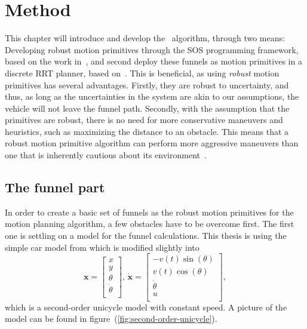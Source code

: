 \chapter{Method}

This chapter will introduce and develop the \rrtfunnel\ algorithm, through two
means: Developing robust motion primitives through the \ac{SOS} programming
framework, based on the work in~\cite{majumdarFunnelLibrariesRealtime2017}, and
second deploy these funnels as motion primitives in a discrete \ac{RRT} planner,
based on~\cite{lavalleLav98cPdf}. This is beneficial, as using \textit{robust}
motion primitives has several advantages. Firstly, they are robust to
uncertainty, and thus, as long as the uncertainties in the system are akin to
our assumptions, the vehicle will not leave the funnel path. Secondly, with the
assumption that the primitives are robust, there is no need for more
conservative maneuvers and heuristics, such as maximizing the distance to an
obstacle. This means that a robust motion primitive algorithm can perform more
aggressive maneuvers than one that is inherently cautious about its
environment~\cite{majumdarFunnelLibrariesRealtime2017}.

\section{The funnel part}

In order to create a basic set of funnels as the robust motion primitives for
the \rrtfunnel{} motion planning algorithm, a few obstacles have to be overcome
first. The first one is settling on a model for the funnel calculations. This
thesis is using the simple car model from \cite[LaValle.p~613]{Lav06} which is
modified slightly into
\begin{equation}
  \label{eq:model-dynamics}
  \mathbf{x} =
  \begin{bmatrix}
    x \\ y \\ \theta \\ \dot{\theta} \\
  \end{bmatrix}, \, \dot{\mathbf{x}} =
  \begin{bmatrix}
    -v(t)\sin(\theta) \\
    v(t)\cos(\theta) \\
    \dot{\theta} \\
    u \\
  \end{bmatrix},
\end{equation}
which is a second-order unicycle model with constant speed. A picture of the
model can be found in figure~(\ref{fig:second-order-unicycle}).

